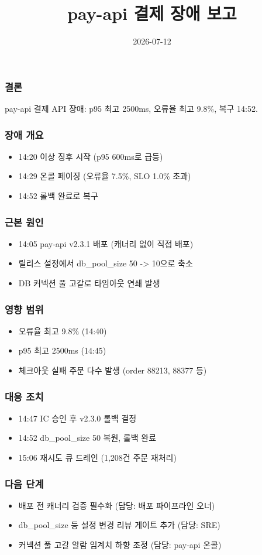 \documentclass{beamer}
\title{pay-api 결제 장애 보고}
\date{2026-07-12}
\begin{document}
\begin{frame}
\frametitle{결론}
pay-api 결제 API 장애: p95 최고 2500ms, 오류율 최고 9.8\%, 복구 14:52.
\end{frame}

\begin{frame}
\frametitle{장애 개요}
\begin{itemize}
\item 14:20 이상 징후 시작 (p95 600ms로 급등)
\item 14:29 온콜 페이징 (오류율 7.5\%, SLO 1.0\% 초과)
\item 14:52 롤백 완료로 복구
\end{itemize}
\end{frame}

\begin{frame}
\frametitle{근본 원인}
\begin{itemize}
\item 14:05 pay-api v2.3.1 배포 (캐너리 없이 직접 배포)
\item 릴리스 설정에서 db\_pool\_size 50 -> 10으로 축소
\item DB 커넥션 풀 고갈로 타임아웃 연쇄 발생
\end{itemize}
\end{frame}

\begin{frame}
\frametitle{영향 범위}
\begin{itemize}
\item 오류율 최고 9.8\% (14:40)
\item p95 최고 2500ms (14:45)
\item 체크아웃 실패 주문 다수 발생 (order 88213, 88377 등)
\end{itemize}
\end{frame}

\begin{frame}
\frametitle{대응 조치}
\begin{itemize}
\item 14:47 IC 승인 후 v2.3.0 롤백 결정
\item 14:52 db\_pool\_size 50 복원, 롤백 완료
\item 15:06 재시도 큐 드레인 (1,208건 주문 재처리)
\end{itemize}
\end{frame}

\begin{frame}
\frametitle{다음 단계}
\begin{itemize}
\item 배포 전 캐너리 검증 필수화 (담당: 배포 파이프라인 오너)
\item db\_pool\_size 등 설정 변경 리뷰 게이트 추가 (담당: SRE)
\item 커넥션 풀 고갈 알람 임계치 하향 조정 (담당: pay-api 온콜)
\end{itemize}
\end{frame}
\end{document}
